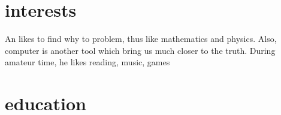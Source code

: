 \documentclass[letterpaper]{twentysecondcv} %
\begin{document}







\makeprofile %


\section{interests}

An likes to find why to problem, thus like mathematics and physics. Also, computer is another tool which bring us much closer to the truth. 
During amateur time, he likes reading, music, games


\section{education}

\begin{twenty} %

\end{twenty}
\end{document}
